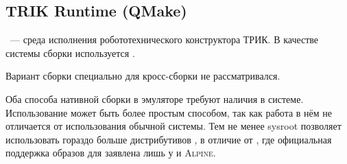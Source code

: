 






\subsection{TRIK Runtime (QMake)}
\label{subsec:qmake_runtime}

\trik{}~--- среда исполнения робототехнического конструктора ТРИК.
В качестве системы сборки используется \qmake{}.

Вариант сборки \qt{} специально для кросс-сборки не рассматривался.

Оба способа нативной сборки в эмуляторе требуют наличия \qemu{} в системе.
Использование \docker{} может быть более простым способом, так как работа в нём не отличается от использования обычной системы.
Тем не менее sysroot позволяет использовать гораздо больше дистрибутивов \linux{}, в отличие от \docker{}, где официальная поддержка образов для \riscv{} заявлена лишь у \debian{} и \textsc{Alpine}.

